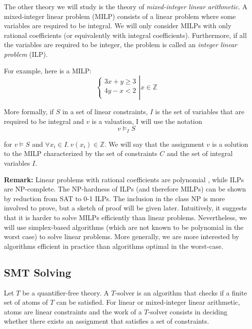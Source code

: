 \documentclass{article}
\newcommand{\ints}{\mathbb{Z}}
\begin{document}
The other theory we will study is the theory of \textit{mixed-integer linear
arithmetic}. A mixed-integer linear problem (MILP) consists of a linear
problem where some variables are required to be integral. We will only consider
MILPs with only rational coefficients (or equivalently with integral
coefficients). Furthermore, if all the variables are required to be
integer, the problem is called an \textit{integer linear problem} (ILP).

For example, here is a MILP:
\begin{displaymath}
  \left\{
  \begin{array}{l}
    3x + y \geqslant 3 \\
    4y - x < 2 \\
  \end{array}
  \right|
  x \in \ints
\end{displaymath}

More formally, if $S$ in a set of linear constraints, $I$ is the set of
variables that are required to be integral and $v$ is a valuation, I will use
the notation $$v \vDash_I S$$

for $v \vDash S$
and $\forall x_i \in I.~v(x_i) \in \ints$. We will say that the assignment $v$
is a solution to the MILP characterized by the set of constraints $C$ and the
set of integral variables $I$.

\textbf{Remark:} Linear problems with rational coefficients are
polynomial \cite[Section 13, 18]{Schrijver1998}, while ILPs are NP-complete.
The NP-hardness of ILPs (and therefore MILPs)
can be shown by reduction from SAT to 0-1 ILPs. The
inclusion in the class NP is more involved to prove, but a sketch of proof will
be given later.
Intuitively, it suggests that it is harder to solve MILPs efficiently than
linear problems. Nevertheless, we will use simplex-based algorithms (which are
not known to be polynomial in the worst case) to solve linear problems. More
generally, we are more interested by algorithms efficient in practice than
algorithms optimal in the worst-case.


\subsection{SMT Solving}
\label{smt}
Let $T$ be a quantifier-free theory. A $T$-solver is an algorithm that checks
if a finite set of atoms of $T$ can be satisfied. For linear or mixed-integer
linear arithmetic, atoms are linear constraints and the work of a $T$-solver
consists in deciding whether there exists an assignment
that satisfies a set of constraints.
\end{document}
